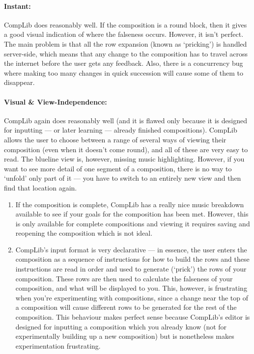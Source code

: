 \documentclass[12pt]{article}
\begin{document}
\paragraph{Instant:}  CompLib does reasonably well.  If the composition is a round block, then it
gives a good visual indication of where the falseness occurs.  However, it isn't perfect.  The main
problem is that all the row expansion (known as `pricking') is handled server-side, which means that
any change to the composition has to travel across the internet before the user gets any feedback.
Also, there is a concurrency bug where making too many changes in quick succession will cause some
of them to disappear.

\paragraph{Visual \& View-Independence:}  CompLib again does reasonably well (and it is flawed only
because it is designed for inputting --- or later learning --- already finished compositions).
CompLib allows the user to choose between a range of several ways of viewing their composition (even
when it doesn't come round), and all of these are very easy to read.  The blueline view is, however,
missing music highlighting.  However, if you want to see more detail of one segment of a
composition, there is no way to `unfold' only part of it --- you have to switch to an entirely new
view and then find that location again.

\begin{enumerate}
    \item If the composition is complete, CompLib has a really nice music breakdown available to see
        if your goals for the composition has been met.  However, this is only available for
        complete compositions and viewing it requires saving and reopening the composition which is
        not ideal.
    \item CompLib's input format is very declarative --- in essence, the user enters the composition
        as a sequence of instructions for how to build the rows and these instructions are read
        in order and used to generate (`prick') the rows of your composition.  These rows are then
        used to calculate the falseness of your composition, and what will be displayed to you.
        This, however, is frustrating when you're experimenting with compositions, since a change
        near the top of a composition will cause different rows to be generated for the rest of the
        composition.  This behaviour makes perfect sense because CompLib's editor is designed for
        inputting a composition which you already know (not for experimentally building up a new
        composition) but is nonetheless makes experimentation frustrating.
\end{enumerate}
\end{document}
